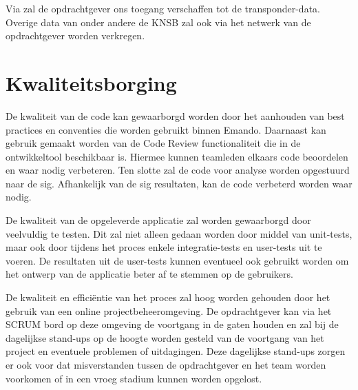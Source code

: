 Via \mylaps zal de opdrachtgever ons toegang verschaffen tot de transponder-data. Overige data van onder andere de KNSB zal ook via het netwerk van de opdrachtgever worden verkregen.

\section{Kwaliteitsborging}
De kwaliteit van de code kan gewaarborgd worden door het aanhouden van best practices en conventies die worden gebruikt binnen Emando. Daarnaast kan gebruik gemaakt worden van de Code Review functionaliteit die in de ontwikkeltool beschikbaar is. Hiermee kunnen teamleden elkaars code beoordelen en waar nodig verbeteren. Ten slotte zal de code voor analyse worden opgestuurd naar de \ac{sig}. Afhankelijk van de \ac{sig} resultaten, kan de code verbeterd worden waar nodig.

De kwaliteit van de opgeleverde applicatie zal worden gewaarborgd door veelvuldig te testen. Dit zal niet alleen gedaan worden door middel van unit-tests, maar ook door tijdens het proces enkele integratie-tests en user-tests uit te voeren. De resultaten uit de user-tests kunnen eventueel ook gebruikt worden om het ontwerp van de applicatie beter af te stemmen op de gebruikers.

De kwaliteit en effici\"entie van het proces zal hoog worden gehouden door het gebruik van een online projectbeheeromgeving. De opdrachtgever kan via het SCRUM bord op deze omgeving de voortgang in de gaten houden en zal bij de dagelijkse stand-ups op de hoogte worden gesteld van de voortgang van het project en eventuele problemen of uitdagingen. Deze dagelijkse stand-ups zorgen er ook voor dat misverstanden tussen de opdrachtgever en het team worden voorkomen of in een vroeg stadium kunnen worden opgelost.